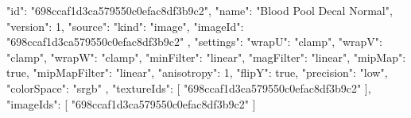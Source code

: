 {
  "id": "698ccaf1d3ca579550c0efac8df3b9c2",
  "name": "Blood Pool Decal Normal",
  "version": 1,
  "source": {
    "kind": "image",
    "imageId": "698ccaf1d3ca579550c0efac8df3b9c2"
  },
  "settings": {
    "wrapU": "clamp",
    "wrapV": "clamp",
    "wrapW": "clamp",
    "minFilter": "linear",
    "magFilter": "linear",
    "mipMap": true,
    "mipMapFilter": "linear",
    "anisotropy": 1,
    "flipY": true,
    "precision": "low",
    "colorSpace": "srgb"
  },
  "textureIds": [
    "698ccaf1d3ca579550c0efac8df3b9c2"
  ],
  "imageIds": [
    "698ccaf1d3ca579550c0efac8df3b9c2"
  ]
}

